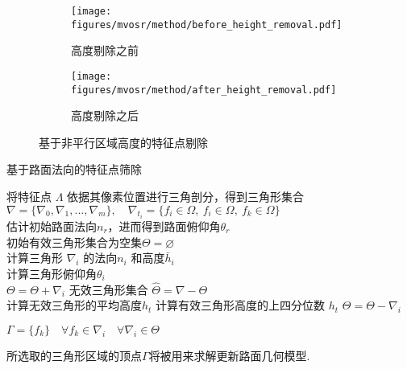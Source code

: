 \begin{figure}
    \centering
    \begin{subfigure}[c]{0.9\textwidth}
        \centering
        \texttt{[image: figures/mvosr/method/before\_height\_removal.pdf]}
        \caption{高度剔除之前}
        \label{fig:mvosr_feature_before_height}
        \vspace*{2mm}
    \end{subfigure}
    \begin{subfigure}[c]{0.9\textwidth}
        \centering
        \texttt{[image: figures/mvosr/method/after\_height\_removal.pdf]}

        \caption{高度剔除之后}
        \label{fig:mvosr_feature_after_height}
    \end{subfigure}

    \caption{基于非平行区域高度的特征点剔除}  
    \label{fig:mvosr_feature_select_by_height}  
\end{figure}

\begin{algorithm}
    \caption{基于路面法向的特征点筛除}
    将特征点 $\Lambda$ 依据其像素位置进行三角剖分，得到三角形集合$\nabla =\{\nabla_0,\nabla_1,...,\nabla_m\},\quad \nabla_{t_i}=\{f_i\in\Omega,\ f_i\in\Omega,\ f_k\in\Omega\}$\\
    估计初始路面法向$n_{r}$，进而得到路面俯仰角$\theta_r$\\
    初始有效三角形集合为空集$\Theta = \varnothing$\\
    {   
        计算三角形 $\nabla_i$ 的法向$n_i$ 和高度$\bar{h}_i$\\
        计算三角形俯仰角$\theta_i$\\
        {
            $\Theta = \Theta + {\nabla_i}$
        }
    }
    {
    无效三角形集合 $\hat{\Theta} = \nabla - \Theta$\\
    计算无效三角形的平均高度$h_t$
    }
    {
        计算有效三角形高度的上四分位数 $h_t$
    }
    {   
        {
            $\Theta = \Theta - {\nabla_i}$
        }
    }

    $\Gamma = \{f_k\} \quad \forall f_k \in  \nabla_i  \quad \forall \nabla_i \in \Theta$
  \label{alg:flat_rejection}
\end{algorithm}
所选取的三角形区域的顶点$\Gamma$将被用来求解更新路面几何模型. 

